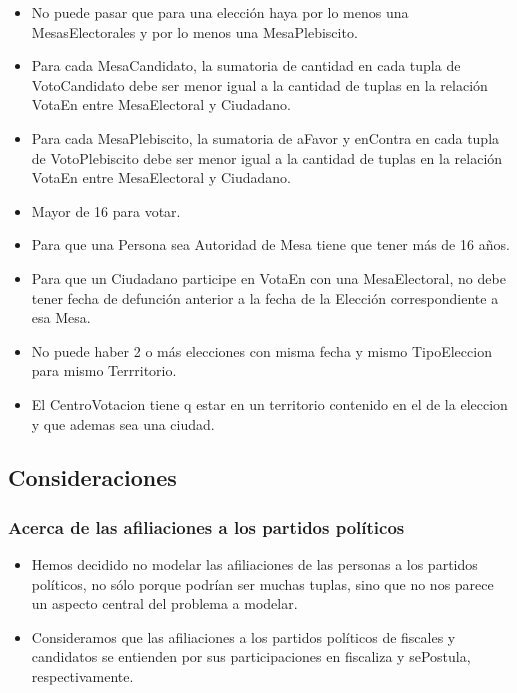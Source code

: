 \begin{itemize}
\item{No puede pasar que para una elección haya por lo menos una  MesasElectorales y por lo menos una MesaPlebiscito.}


\item{Para cada MesaCandidato, la sumatoria de cantidad en cada tupla de VotoCandidato debe ser menor igual a la cantidad de tuplas en la relación VotaEn entre MesaElectoral y Ciudadano.}

\item{Para cada MesaPlebiscito, la sumatoria de aFavor y enContra en cada tupla de VotoPlebiscito debe ser menor igual a la cantidad de tuplas en la relación VotaEn entre MesaElectoral y Ciudadano.}

\item{Mayor de 16 para votar.}

\item{Para que una Persona sea Autoridad de Mesa tiene que tener más de 16 años.}


\item{Para que un Ciudadano participe en VotaEn con una MesaElectoral, no debe tener fecha de defunción anterior a la fecha de la Elección correspondiente a esa Mesa.}

\item{No puede haber 2 o más  elecciones con misma fecha y mismo TipoEleccion para mismo Terrritorio.}

\item{El CentroVotacion tiene q estar en un territorio contenido en el de la eleccion y que ademas sea una ciudad.}

\end{itemize}


\subsection{Consideraciones}

\subsubsection{Acerca de las afiliaciones a los partidos políticos}

\begin{itemize}
\item{Hemos decidido no modelar las afiliaciones de las personas a los partidos políticos, no sólo porque podrían ser muchas tuplas, sino que no nos parece un aspecto central del problema a modelar.}

\item{Consideramos que las afiliaciones a los partidos políticos de fiscales y candidatos se entienden por sus participaciones en fiscaliza y sePostula, respectivamente.}
\end{itemize}

